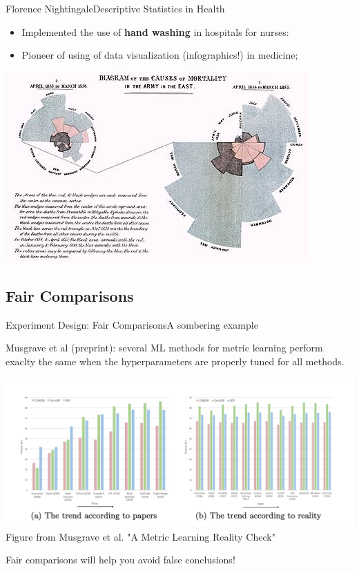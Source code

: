 \begin{frame}{Florence Nightingale}{Descriptive Statistics in Health}
  \begin{itemize}
    \item Implemented the use of {\bf hand washing} in hospitals for nurses:
    \item Pioneer of using of data visualization (infographics!) in medicine;
  \end{itemize}
  \begin{center}


    \includegraphics[width=.7\textwidth]{../img/florence_diagram}
  \end{center}
\end{frame}

\subsection{Fair Comparisons}

\begin{frame}{Experiment Design: Fair Comparisons}{A sombering example}

  Musgrave et al (preprint): several ML methods for metric learning perform exaclty the same when the hyperparameters are properly tuned for all methods.

  \begin{center}
    \includegraphics[width=.8\textwidth]{../img/musgrave_faircomparison}\\
    {\tiny Figure from Musgrave et al. "A Metric Learning Reality Check"}
  \end{center}

  \alert{Fair comparisons will help you avoid false conclusions!}
\end{frame}

